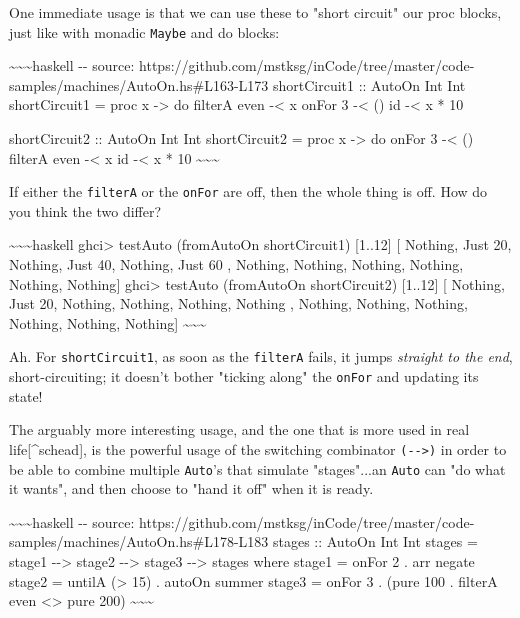 \documentclass[]{article}
\begin{document}
One immediate usage is that we can use these to "short circuit" our proc blocks,
just like with monadic \texttt{Maybe} and do blocks:

\textasciitilde{}\textasciitilde{}\textasciitilde{}haskell -\/- source:
https://github.com/mstksg/inCode/tree/master/code-samples/machines/AutoOn.hs\#L163-L173
shortCircuit1 :: AutoOn Int Int shortCircuit1 = proc x -\textgreater{} do
filterA even -\textless{} x onFor 3 -\textless{} () id -\textless{} x * 10

shortCircuit2 :: AutoOn Int Int shortCircuit2 = proc x -\textgreater{} do onFor
3 -\textless{} () filterA even -\textless{} x id -\textless{} x * 10
\textasciitilde{}\textasciitilde{}\textasciitilde{}

If either the \texttt{filterA} or the \texttt{onFor} are off, then the whole
thing is off. How do you think the two differ?

\textasciitilde{}\textasciitilde{}\textasciitilde{}haskell ghci\textgreater{}
testAuto (fromAutoOn shortCircuit1) {[}1..12{]} {[} Nothing, Just 20, Nothing,
Just 40, Nothing, Just 60 , Nothing, Nothing, Nothing, Nothing, Nothing,
Nothing{]} ghci\textgreater{} testAuto (fromAutoOn shortCircuit2) {[}1..12{]}
{[} Nothing, Just 20, Nothing, Nothing, Nothing, Nothing , Nothing, Nothing,
Nothing, Nothing, Nothing, Nothing{]}
\textasciitilde{}\textasciitilde{}\textasciitilde{}

Ah. For \texttt{shortCircuit1}, as soon as the \texttt{filterA} fails, it jumps
\emph{straight to the end}, short-circuiting; it doesn't bother "ticking along"
the \texttt{onFor} and updating its state!

The arguably more interesting usage, and the one that is more used in real
life{[}\^{}schead{]}, is the powerful usage of the switching combinator
\texttt{(-\/-\textgreater{})} in order to be able to combine multiple
\texttt{Auto}'s that simulate "stages"...an \texttt{Auto} can "do what it
wants", and then choose to "hand it off" when it is ready.

\textasciitilde{}\textasciitilde{}\textasciitilde{}haskell -\/- source:
https://github.com/mstksg/inCode/tree/master/code-samples/machines/AutoOn.hs\#L178-L183
stages :: AutoOn Int Int stages = stage1 -\/-\textgreater{} stage2
-\/-\textgreater{} stage3 -\/-\textgreater{} stages where stage1 = onFor 2 . arr
negate stage2 = untilA (\textgreater{} 15) . autoOn summer stage3 = onFor 3 .
(pure 100 . filterA even \textless{}\textbar{}\textgreater{} pure 200)
\textasciitilde{}\textasciitilde{}\textasciitilde{}
\end{document}
